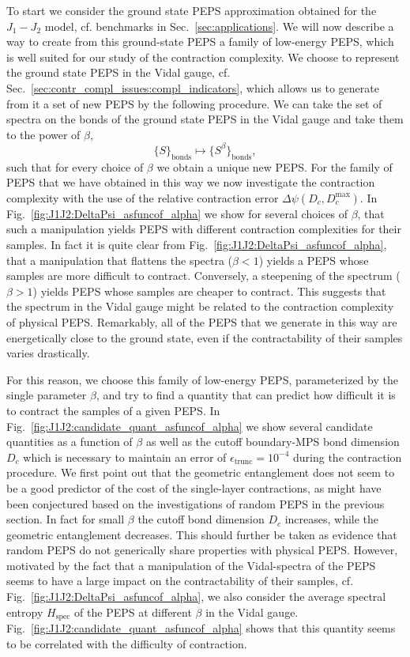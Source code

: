 \documentclass[aps,notitlepage,twocolumn,nofootinbib,superscriptaddress,pra,10pt]{revtex4-2}
\begin{document}
To start we consider the ground state PEPS approximation obtained for the $J_1-J_2$ model, cf. benchmarks in Sec.~\ref{sec:applications}.
We will now describe a way to create from this ground-state PEPS a family of low-energy PEPS, which is well suited for our study of the contraction complexity.
We choose to represent the ground state PEPS in the Vidal gauge, cf. Sec.~\ref{sec:contr_compl_issues:compl_indicators}, which allows us to generate from it a set of new PEPS by the following procedure. 
We can take the set of spectra on the bonds of the ground state PEPS in the Vidal gauge and take them to the power of $\beta$,
\begin{equation}
    \{ S \}_{\text{bonds}} \mapsto \{ S^{\beta} \}_{\text{bonds}},
\end{equation}
such that for every choice of $\beta$ we obtain a unique new PEPS. 
For the family of PEPS that we have obtained in this way we now investigate the contraction complexity with the use of the relative contraction error $\Delta\psi(D_c, D_c^{\max})$. 
In Fig.~\ref{fig:J1J2:DeltaPsi_asfuncof_alpha} we show for several choices of $\beta$, that such a manipulation yields PEPS with different contraction complexities for their samples.
In fact it is quite clear from Fig.~\ref{fig:J1J2:DeltaPsi_asfuncof_alpha}, that a manipulation that flattens the spectra ($\beta < 1$) yields a PEPS whose samples are more difficult to contract. 
Conversely, a steepening of the spectrum ($\beta > 1$) yields PEPS whose samples are cheaper to contract. 
This suggests that the spectrum in the Vidal gauge might be related to the contraction complexity of physical PEPS.
Remarkably, all of the PEPS that we generate in this way are energetically close to the ground state, even if the contractability of their samples varies drastically.

For this reason, we choose this family of low-energy PEPS, parameterized by the single parameter $\beta$, and try to find a quantity that can predict how difficult it is to contract the samples of a given PEPS. 
In Fig.~\ref{fig:J1J2:candidate_quant_asfuncof_alpha} we show several candidate quantities as a function of $\beta$ as well as the cutoff boundary-MPS bond dimension $D_c$ which is necessary to maintain an error of $\epsilon_\text{trunc} = 10^{-4}$ during the contraction procedure. 
We first point out that the geometric entanglement does not seem to be a good predictor of the cost of the single-layer contractions, as might have been conjectured based on the investigations of random PEPS in the previous section. 
In fact for small $\beta$ the cutoff bond dimension $D_c$ increases, while the geometric entanglement decreases. 
This should further be taken as evidence that random PEPS do not generically share properties with physical PEPS. 
However, motivated by the fact that a manipulation of the Vidal-spectra of the PEPS seems to have a large impact on the contractability of their samples, cf. Fig.~\ref{fig:J1J2:DeltaPsi_asfuncof_alpha}, we also consider the average spectral entropy $H_\text{spec}$ of the PEPS at different $\beta$ in the Vidal gauge. Fig.~\ref{fig:J1J2:candidate_quant_asfuncof_alpha} shows that this quantity seems to be correlated with the difficulty of contraction.
\end{document}
